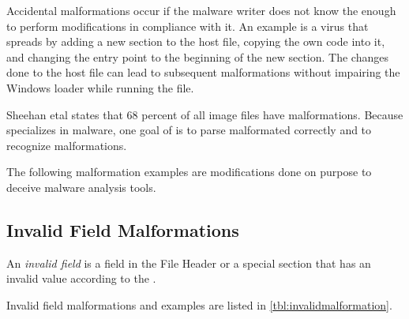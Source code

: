 Accidental malformations occur if the malware writer does not know the \PECOFF{} enough to perform modifications in compliance with it. An example is a virus that spreads by adding a new section to the host file, copying the own code into it, and changing the entry point to the beginning of the new section. The changes done to the host file can lead to subsequent malformations without impairing the Windows loader while running the file.

Sheehan et\thinspace{}al states that 68 percent of all image files have malformations. \cite[slide 7]{sheehan07}
Because \portex{} specializes in \PE{} malware, one goal of \portex{} is to parse malformated  correctly and to recognize malformations.


The following malformation examples are modifications done on purpose to deceive malware analysis tools.

\subsection{Invalid Field Malformations}

\begin{definition}
An \emph{invalid field} is a field in the \PE{} File Header or a special section that has an invalid value according to the \PECOFF{}.
\end{definition} 

Invalid field malformations and examples are listed in \autoref{tbl:invalidmalformation}.

